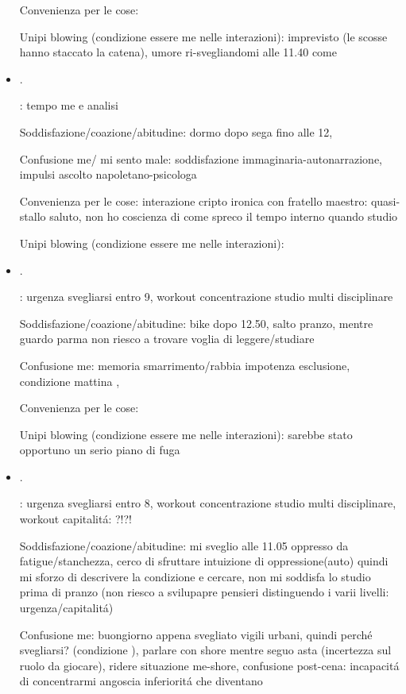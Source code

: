 \begin{itemize}
Convenienza per le cose:

Unipi blowing (condizione essere me nelle interazioni): imprevisto (le scosse hanno staccato la catena), umore ri-svegliandomi alle 11.40 come

\item {}.

: tempo me e analisi

Soddisfazione/coazione/abitudine: dormo dopo sega fino alle 12,

Confusione me/ mi sento male: soddisfazione immaginaria-autonarrazione, impulsi ascolto napoletano-psicologa

Convenienza per le cose: interazione cripto ironica con fratello maestro: quasi-stallo saluto, non ho coscienza di come spreco il tempo interno quando studio

Unipi blowing (condizione essere me nelle interazioni):

\item {}.

: urgenza svegliarsi entro 9, workout concentrazione studio multi disciplinare

Soddisfazione/coazione/abitudine: bike dopo 12.50, salto pranzo, mentre guardo parma non riesco a trovare voglia di leggere/studiare

Confusione me: memoria smarrimento/rabbia impotenza esclusione, condizione mattina ,

Convenienza per le cose:

Unipi blowing (condizione essere me nelle interazioni): sarebbe stato opportuno un serio piano di fuga

\item {}.

: urgenza svegliarsi entro 8, workout concentrazione studio multi disciplinare, workout capitalit\'a: ?!?!

Soddisfazione/coazione/abitudine: mi sveglio alle 11.05 oppresso da fatigue/stanchezza, cerco di sfruttare intuizione di oppressione(auto) quindi mi sforzo di descrivere la condizione e cercare, non mi soddisfa lo studio prima di pranzo (non riesco a svilupapre pensieri distinguendo i varii livelli: urgenza/capitalit\'a)

Confusione me: buongiorno appena svegliato vigili urbani, quindi perch\'e svegliarsi? (condizione ), parlare con shore mentre seguo asta (incertezza sul ruolo da giocare), ridere situazione me-shore, confusione post-cena: incapacit\'a di concentrarmi angoscia inferiorit\'a che diventano 


\end{itemize}
